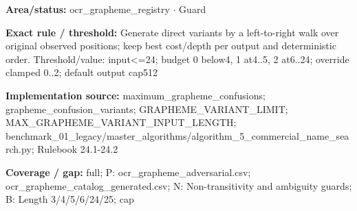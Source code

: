 \begin{tcolorbox}[enhanced,breakable,colback=white,colframe=Muted!45,boxrule=0.45pt,arc=1.5pt,left=6pt,right=6pt,top=5pt,bottom=5pt,title={\texttt{OCR-VARIANT-BOUNDS-13}},title after break={\texttt{OCR-VARIANT-BOUNDS-13}\ (continued)},fonttitle=\headingfont\bfseries\color{Navy},coltitle=Navy]
\textbf{Area/status:} ocr\_\allowbreak{}grapheme\_\allowbreak{}registry $\boldsymbol{\cdot}$ Guard\par
\smallskip
\textbf{Exact rule / threshold:} Generate direct variants by a left-to-right walk over original observed positions; keep best cost/\allowbreak{}depth per output and deterministic order. Threshold/\allowbreak{}value: input<=24; budget 0 below4, 1 at4..5, 2 at6..24; override clamped 0..2; default output cap512\par
\smallskip
\textbf{Implementation source:} maximum\_\allowbreak{}grapheme\_\allowbreak{}confusions; grapheme\_\allowbreak{}confusion\_\allowbreak{}variants; GRAPHEME\_\allowbreak{}VARIANT\_\allowbreak{}LIMIT; MAX\_\allowbreak{}GRAPHEME\_\allowbreak{}VARIANT\_\allowbreak{}INPUT\_\allowbreak{}LENGTH; benchmark\_\allowbreak{}01\_\allowbreak{}legacy/\allowbreak{}master\_\allowbreak{}algorithms/\allowbreak{}algorithm\_\allowbreak{}5\_\allowbreak{}commercial\_\allowbreak{}name\_\allowbreak{}search.py; Rulebook 24.1-24.2\par
\smallskip
\textbf{Coverage / gap:} full; P: ocr\_\allowbreak{}grapheme\_\allowbreak{}adversarial.csv; ocr\_\allowbreak{}grapheme\_\allowbreak{}catalog\_\allowbreak{}generated.csv; N: Non-transitivity and ambiguity guards; B: Length 3/\allowbreak{}4/\allowbreak{}5/\allowbreak{}6/\allowbreak{}24/\allowbreak{}25; cap
\end{tcolorbox}
\medskip
